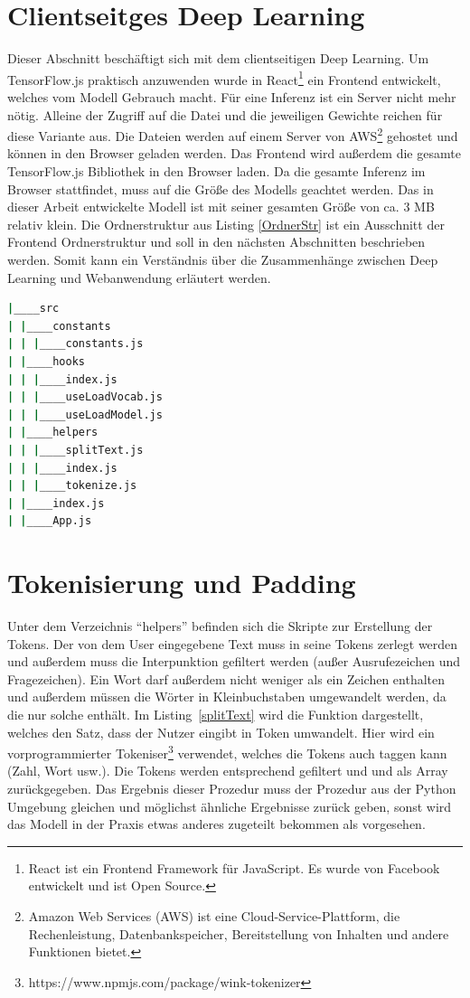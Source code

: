 \section{Clientseitges Deep Learning}
Dieser Abschnitt beschäftigt sich mit dem clientseitigen Deep Learning. Um TensorFlow.js praktisch anzuwenden wurde in React\footnote{React ist ein Frontend Framework für JavaScript. Es wurde von Facebook entwickelt und ist Open Source.} ein Frontend entwickelt, welches vom Modell Gebrauch macht. Für eine Inferenz ist ein Server nicht mehr nötig. Alleine der Zugriff auf die  Datei und die jeweiligen Gewichte reichen für diese Variante aus. Die Dateien werden auf einem Server von AWS\footnote{Amazon Web Services (AWS) ist eine Cloud-Service-Plattform, die Rechenleistung, Datenbankspeicher, Bereitstellung von Inhalten und andere Funktionen bietet.} gehostet und können in den Browser geladen werden. Das Frontend wird außerdem die gesamte TensorFlow.js Bibliothek in den Browser laden. Da die gesamte Inferenz im Browser stattfindet, muss auf die Größe des Modells geachtet werden. Das in dieser Arbeit entwickelte Modell ist mit seiner gesamten Größe von ca. 3 MB relativ klein. Die Ordnerstruktur aus Listing \ref{OrdnerStr} ist ein Ausschnitt der Frontend Ordnerstruktur und soll in den nächsten Abschnitten beschrieben werden. Somit kann ein Verständnis über die Zusammenhänge zwischen Deep Learning und Webanwendung erläutert werden.

\begin{lstlisting}[language=bash,caption=Wichtigste Elemente der Benutzeroberfläche, label={OrdnerStr}]
|____src
| |____constants
| | |____constants.js
| |____hooks
| | |____index.js
| | |____useLoadVocab.js
| | |____useLoadModel.js
| |____helpers
| | |____splitText.js
| | |____index.js
| | |____tokenize.js
| |____index.js
| |____App.js
\end{lstlisting}

\section{Tokenisierung und Padding}
Unter dem Verzeichnis \enquote{helpers} befinden sich die Skripte zur Erstellung der Tokens. Der von dem User eingegebene Text muss in seine Tokens zerlegt werden und außerdem muss die Interpunktion gefiltert werden (außer Ausrufezeichen und Fragezeichen). Ein Wort darf außerdem nicht weniger als ein Zeichen enthalten und außerdem müssen die Wörter in Kleinbuchstaben umgewandelt werden, da die  nur solche enthält. Im Listing~\ref{splitText} wird die Funktion dargestellt, welches den Satz, dass der Nutzer eingibt in Token umwandelt. Hier wird ein vorprogrammierter Tokeniser\footnote{https://www.npmjs.com/package/wink-tokenizer} verwendet, welches die Tokens auch taggen kann (Zahl, Wort usw.). Die Tokens werden entsprechend gefiltert und und als Array zurückgegeben. Das Ergebnis dieser Prozedur muss der Prozedur aus der Python Umgebung gleichen und möglichst ähnliche Ergebnisse zurück geben, sonst wird das Modell in der Praxis etwas anderes zugeteilt bekommen als vorgesehen. 

